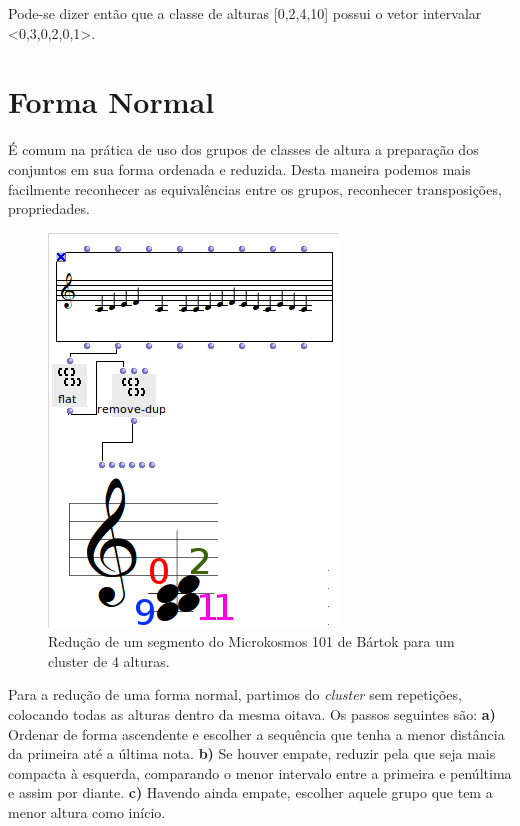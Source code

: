 \documentclass[
	12pt,				%
	openright,			%
	twoside,			%
	a4paper,			%
	english,			%
	french,				%
	spanish,			%
	brazil				%
	]{abntex2}
\begin{document}
\begin{apendicesenv}
Pode-se dizer então que a classe de alturas [0,2,4,10] possui o vetor intervalar <0,3,0,2,0,1>.


\section{Forma Normal} 

É comum na prática de uso dos grupos de classes de altura a preparação dos conjuntos em sua forma ordenada e reduzida. Desta maneira podemos mais facilmente reconhecer as equivalências entre os grupos, reconhecer transposições, propriedades.


\begin{figure}[h]
	\caption{\label{fig_grafico}Redução de um segmento do Microkosmos 101 de Bártok para um cluster de 4 alturas. }
	\begin{center}
	    \includegraphics[scale=0.7]{OM_settheory/reducao_acorde.png}
	\end{center}
\end{figure}

Para a redução de uma forma normal, partimos do \textit{cluster} sem repetições, colocando todas as alturas dentro da mesma oitava. Os passos seguintes são: 
\textbf{a)} Ordenar de forma ascendente e escolher a sequência que tenha a menor distância da primeira até a última nota.
\textbf{b)} Se houver empate, reduzir pela que seja mais compacta à esquerda, comparando o menor intervalo entre a primeira e penúltima e assim por diante.
\textbf{c)} Havendo ainda empate, escolher aquele grupo que tem a menor altura como início. 


\end{apendicesenv}
\end{document}
